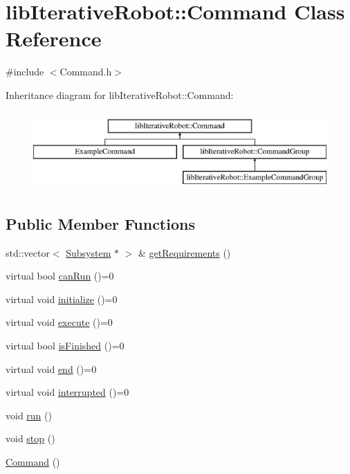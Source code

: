 \hypertarget{classlib_iterative_robot_1_1_command}{}\section{lib\+Iterative\+Robot\+::Command Class Reference}
\label{classlib_iterative_robot_1_1_command}


{\ttfamily \#include $<$Command.\+h$>$}

Inheritance diagram for lib\+Iterative\+Robot\+::Command\+:\begin{figure}[H]
\begin{center}
\leavevmode
\includegraphics[height=3.000000cm]{classlib_iterative_robot_1_1_command}
\end{center}
\end{figure}
\subsection*{Public Member Functions}
\begin{DoxyCompactItemize}
\item 
std\+::vector$<$ \mbox{\hyperlink{classlib_iterative_robot_1_1_subsystem}{Subsystem}} $\ast$ $>$ \& \mbox{\hyperlink{classlib_iterative_robot_1_1_command_a447ba6e394f165c6d358471a8bbdc76a}{get\+Requirements}} ()
\item 
virtual bool \mbox{\hyperlink{classlib_iterative_robot_1_1_command_aebef0fdf029a15ee48fbb778c4265609}{can\+Run}} ()=0
\item 
virtual void \mbox{\hyperlink{classlib_iterative_robot_1_1_command_a14543c9d38b07e52f9ffb2af88a63f60}{initialize}} ()=0
\item 
virtual void \mbox{\hyperlink{classlib_iterative_robot_1_1_command_a4b38164af1a8645fae2fdae296317cf4}{execute}} ()=0
\item 
virtual bool \mbox{\hyperlink{classlib_iterative_robot_1_1_command_a8e4dccdd88f432a716090f532ba097f7}{is\+Finished}} ()=0
\item 
virtual void \mbox{\hyperlink{classlib_iterative_robot_1_1_command_ab30847f09859387b70bb7846f7ce7ca4}{end}} ()=0
\item 
virtual void \mbox{\hyperlink{classlib_iterative_robot_1_1_command_a1c17b601d1b69822cabadb92069d1747}{interrupted}} ()=0
\item 
void \mbox{\hyperlink{classlib_iterative_robot_1_1_command_a3f3790d1b8033d7253a9f44481032ee9}{run}} ()
\item 
void \mbox{\hyperlink{classlib_iterative_robot_1_1_command_ac91308101424f447f80665244b554171}{stop}} ()
\item 
\mbox{\hyperlink{classlib_iterative_robot_1_1_command_a18df2d81039392daeb0b78c346a70537}{Command}} ()
\end{DoxyCompactItemize}

